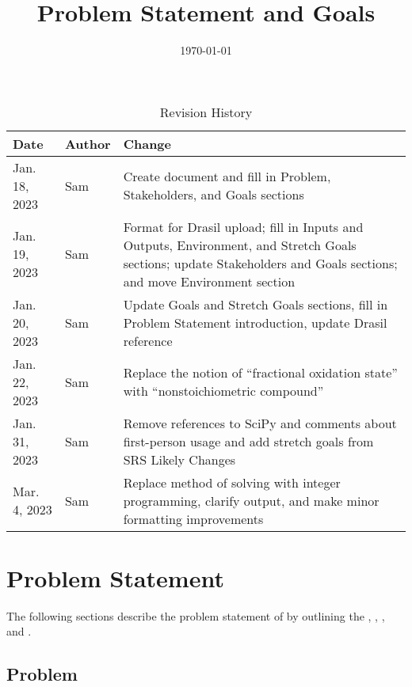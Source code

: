 \documentclass{article}
\title{Problem Statement and Goals\\\progname}
\author{\authname}
\date{\today}
\begin{document}
\maketitle

\begin{table}[hp]
	\caption{Revision History} \label{TblRevisionHistory}
	\begin{tabularx}{\textwidth}{llX}
		\toprule
		\textbf{Date} & \textbf{Author} & \textbf{Change}                    \\
		\midrule
		Jan. 18, 2023 & Sam             & Create document and fill in
		Problem, Stakeholders, and Goals sections                            \\
		Jan. 19, 2023 & Sam             & Format for Drasil upload;
		fill in Inputs and Outputs, Environment, and Stretch Goals sections;
		update Stakeholders and Goals sections; and move Environment section \\
		Jan. 20, 2023 & Sam             & Update Goals and Stretch
		Goals sections, fill in Problem Statement introduction, update
		Drasil reference                                                     \\
		Jan. 22, 2023 & Sam             & Replace the notion of
		``fractional oxidation state'' with ``nonstoichiometric compound''   \\
		Jan. 31, 2023 & Sam             & Remove references to SciPy
		and comments about first-person usage and add stretch goals from SRS
		Likely Changes                                                       \\
		Mar. 4, 2023  & Sam             & Replace method of solving
		with integer programming, clarify output, and make minor formatting
		improvements                                                         \\
		\bottomrule
	\end{tabularx}
\end{table}

\section{Problem Statement}

The following sections describe the problem statement of \progname{}
by outlining the , , , and
.

\subsection{Problem} \label{prob}
\end{document}
